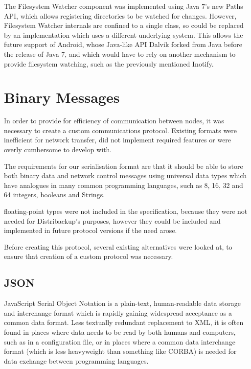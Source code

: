 \documentclass[12pt,a4paper,]{adreport}
\begin{document}
The Filesystem Watcher component was implemented using Java 7's new
Paths API, which allows registering directories to be watched for
changes. However, Filesystem Watcher internals are confined to a single
class, so could be replaced by an implementation which uses a different
underlying system. This allows the future support of Android, whose
Java-like API Dalvik forked from Java before the release of Java 7, and
which would have to rely on another mechanism to provide filesystem
watching, such as the previously mentioned Inotify.

\section{Binary Messages}\label{binary-messages}

In order to provide for efficiency of communication between nodes, it
was necessary to create a custom communications protocol. Existing
formats were inefficient for network transfer, did not implement
required features or were overly cumbersome to develop with.

The requirements for our serialisation format are that it should be able
to store both binary data and network control messages using universal
data types which have analogues in many common programming languages,
such as 8, 16, 32 and 64 integers, booleans and Strings.

floating-point types were not included in the specification, because
they were not needed for Distribackup's purposes, however they could be
included and implemented in future protocol versions if the need arose.

Before creating this protocol, several existing alternatives were looked
at, to ensure that creation of a custom protocol was necessary.

\subsection{JSON}\label{json}

JavaScript Serial Object Notation is a plain-text, human-readable data
storage and interchange format which is rapidly gaining widespread
acceptance as a common data format. Less textually redundant replacement
to XML, it is often found in places where data needs to be read by both
humans and computers, such as in a configuration file, or in places
where a common data interchange format (which is less heavyweight than
something like CORBA) is needed for data exchange between programming
languages.
\end{document}
